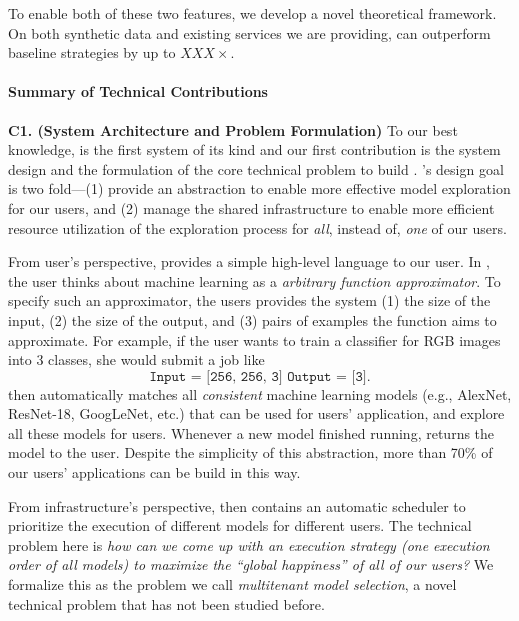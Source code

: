 To enable both
of these two features, we develop
a novel theoretical framework.
On both synthetic data and existing services
we are providing, \eml can outperform 
baseline strategies by up to $XXX\times$.


\paragraph*{Summary of Technical Contributions}

\vspace{0.5em} \noindent
{\bf C1. (System Architecture and Problem Formulation)}
To our best knowledge, \eml is the first system of its kind
and our first contribution is the system design and the formulation
of the core technical problem to build \eml. 
\eml's design goal is two fold---(1) provide an abstraction
to enable more effective model exploration for our users, and 
(2) manage the shared infrastructure to enable more efficient
resource utilization of the exploration process 
for {\em all}, instead of, {\em one} of our users.

From user's perspective, \eml provides a simple high-level 
language to our user. In \eml, the user thinks about 
machine learning as a {\em arbitrary function approximator}.
To specify such an approximator, the users provides the
system (1) the size of the input, (2) the size of the output,
and (3) pairs of examples the function aims to approximate.
For example, if the user wants to train a classifier
for RGB images into 3 classes, she would submit a job like
\[
\texttt{Input = [256, 256, 3]
        Output = [3]}.
\]
\eml then automatically matches all {\em consistent} machine
learning models (e.g., AlexNet, ResNet-18, GoogLeNet, etc.) 
that can be used for users' application, and
explore all these models for users. Whenever a new model
finished running, \eml returns the model to the user.
Despite the simplicity of this abstraction, more than 70\% of
our users' applications can be build in this way.

From infrastructure's perspective, \eml then contains an
automatic scheduler to prioritize the execution of
different models for different users. The technical problem
here is {\em how can we come up with an execution strategy
(one execution order of all models) to maximize the
``global happiness'' of all of our users?} We formalize
this as the problem we call {\em multitenant model selection},
a novel technical problem that has not been studied before.

